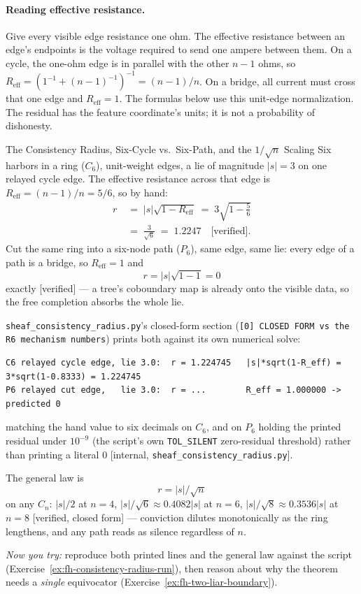 \documentclass[11pt,a4paper]{article}
\theoremstyle{definition}
\theoremstyle{remark}
\begin{document}
\paragraph{Reading effective resistance.}
Give every visible edge resistance one ohm. The effective resistance between
an edge's endpoints is the voltage required to send one ampere between them.
On a cycle, the one-ohm edge is in parallel with the other $n-1$ ohms, so
$R_{\mathrm{eff}}=(1^{-1}+(n-1)^{-1})^{-1}=(n-1)/n$. On a bridge, all
current must cross that one edge and $R_{\mathrm{eff}}=1$. The formulas below
use this unit-edge normalization. The residual has the feature coordinate's
units; it is not a probability of dishonesty.

\begin{pdexample}{The Consistency Radius, Six-Cycle vs.\ Six-Path, and the $1/\sqrt n$ Scaling}
\setlength{\parskip}{4pt plus 1pt}
Six harbors in a ring ($C_6$), unit-weight edges, a lie of magnitude $|s|=3$ on one relayed cycle edge. The effective resistance across that edge is $R_{\mathrm{eff}}=(n-1)/n=5/6$, so by hand:
\[
\begin{aligned}
r \;&=\; |s|\sqrt{1-R_{\mathrm{eff}}} \;=\; 3\sqrt{1-\tfrac56}\\
&=\; \tfrac{3}{\sqrt6} \;=\; 1.2247 \quad\text{[verified]}.
\end{aligned}
\]
Cut the same ring into a six-node path ($P_6$), same edge, same lie: every edge of a path is a bridge, so $R_{\mathrm{eff}}=1$ and \[
r=|s|\sqrt{1-1}=0
\] exactly [verified] --- a tree's coboundary map is already onto the visible data, so the free completion absorbs the whole lie.

\texttt{sheaf\_consistency\_radius.py}'s closed-form section (\texttt{[0] CLOSED FORM vs the R6 mechanism numbers}) prints both against its own numerical solve:
\begin{lstlisting}
C6 relayed cycle edge, lie 3.0:  r = 1.224745   |s|*sqrt(1-R_eff) = 3*sqrt(1-0.8333) = 1.224745
P6 relayed cut edge,   lie 3.0:  r = ...        R_eff = 1.000000 -> predicted 0
\end{lstlisting}
matching the hand value to six decimals on $C_6$, and on $P_6$ holding the printed residual under $10^{-9}$ (the script's own \texttt{TOL\_SILENT} zero-residual threshold) rather than printing a literal $0$ [internal, \texttt{sheaf\_consistency\_radius.py}].

The general law is \[
r=|s|/\sqrt n
\] on any $C_n$: $|s|/2$ at $n{=}4$, $|s|/\sqrt6\approx0.4082|s|$ at $n{=}6$, $|s|/\sqrt8\approx0.3536|s|$ at $n{=}8$ [verified, closed form] --- conviction dilutes monotonically as the ring lengthens, and any path reads as silence regardless of $n$.

\emph{Now you try:} reproduce both printed lines and the general law against the script (Exercise~\ref{ex:fh-consistency-radius-run}), then reason about why the theorem needs a \emph{single} equivocator (Exercise~\ref{ex:fh-two-liar-boundary}).
\end{pdexample}
\end{document}
